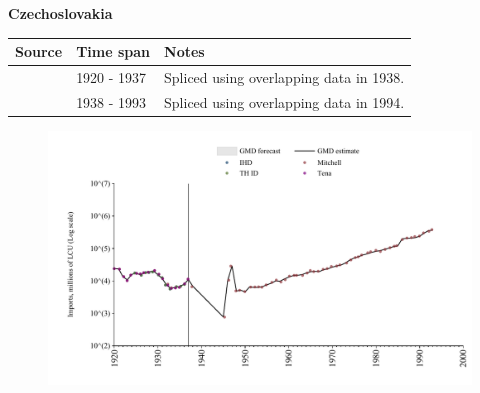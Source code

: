 \documentclass[12pt,a4paper,landscape]{article}
\begin{document}
\begin{adjustbox}{max totalsize={\paperwidth}{\paperheight},center}
\begin{minipage}[t][\textheight][t]{\textwidth}
\vspace*{0.5cm}
{}
\begin{center}
{\Large\bfseries Czechoslovakia}
\end{center}
\vspace{0.5cm}
\begin{table}[H]
\centering
\small
\begin{tabular}{|l|l|l|}
\hline
\textbf{Source} & \textbf{Time span} & \textbf{Notes} \\
\hline
\rowcolor{white}\cite{Tena}& 1920 - 1937 &Spliced using overlapping data in 1938.\\
\rowcolor{lightgray}\cite{Mitchell}& 1938 - 1993 &Spliced using overlapping data in 1994.\\
\hline
\end{tabular}
\end{table}
\begin{figure}[H]
\centering
\includegraphics[width=\textwidth,height=0.6\textheight,keepaspectratio]{graphs/CSK_imports.pdf}
\end{figure}
\end{minipage}
\end{adjustbox}
\end{document}
